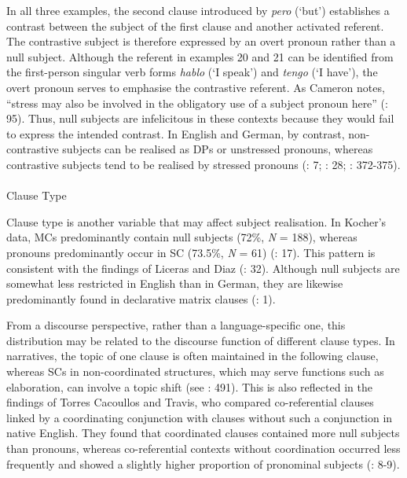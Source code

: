 \documentclass[
  letterpaper,
  DIV=11,
  numbers=noendperiod]{scrartcl}
\makeatletter
\let\oldparagraph\paragraph
\renewcommand{\paragraph}{
    \@ifstar
      \xxxParagraphStar
      \xxxParagraphNoStar
  }
\newcommand{\xxxParagraphStar}[1]{\oldparagraph*{#1}\mbox{}}
\newcommand{\xxxParagraphNoStar}[1]{\oldparagraph{#1}\mbox{}}
\makeatother
\begin{document}
In all three examples, the second clause introduced by \emph{pero}
(`but') establishes a contrast between the subject of the first clause
and another activated referent. The contrastive subject is therefore
expressed by an overt pronoun rather than a null subject. Although the
referent in examples 20 and 21 can be identified from the first-person
singular verb forms \emph{hablo} (`I speak') and \emph{tengo} (`I
have'), the overt pronoun serves to emphasise the contrastive referent.
As Cameron notes, ``stress may also be involved in the obligatory use of
a subject pronoun here'' (: 95). Thus,
null subjects are infelicitous in these contexts because they would fail
to express the intended contrast. In English and German, by contrast,
non-contrastive subjects can be realised as DPs or unstressed pronouns,
whereas contrastive subjects tend to be realised by stressed pronouns
(: 7;
: 28;
:
372-375).

\paragraph{Clause Type}\label{clause-type}

Clause type is another variable that may affect subject realisation. In
Kocher's data, MCs predominantly contain null subjects (72\%, \emph{N} =
188), whereas pronouns predominantly occur in SC (73.5\%, \emph{N} = 61)
(: 17). This pattern is
consistent with the findings of Liceras and Diaz
(: 32). Although null
subjects are somewhat less restricted in English than in German, they
are likewise predominantly found in declarative matrix clauses
(: 1).

From a discourse perspective, rather than a language-specific one, this
distribution may be related to the discourse function of different
clause types. In narratives, the topic of one clause is often maintained
in the following clause, whereas SCs in non-coordinated structures,
which may serve functions such as elaboration, can involve a topic shift
(see : 491). This is
also reflected in the findings of Torres Cacoullos and Travis, who
compared co-referential clauses linked by a coordinating conjunction
with clauses without such a conjunction in native English. They found
that coordinated clauses contained more null subjects than pronouns,
whereas co-referential contexts without coordination occurred less
frequently and showed a slightly higher proportion of pronominal
subjects (: 8-9).
\end{document}
